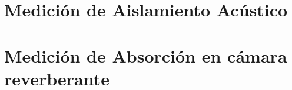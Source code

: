 \section{Medición de Aislamiento Acústico}
\resetallcounters

\clearpage


\section{Medición de Absorción en cámara reverberante}
\resetallcounters

\clearpage


